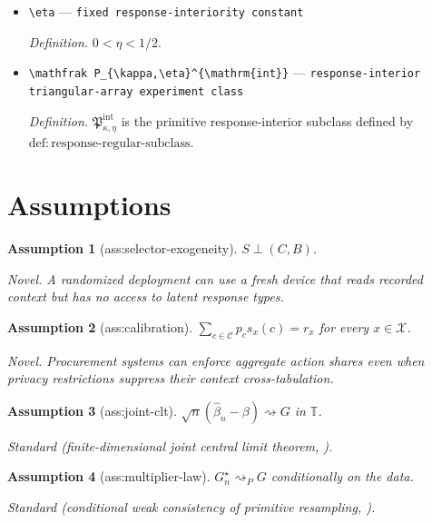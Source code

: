 \documentclass{article}
\newtheorem{assumption}{Assumption}
\begin{document}
\begin{itemize}
  \item \texttt{\textbackslash{}\allowbreak{}eta} --- \texttt{fixed response-\allowbreak{}interiority constant}
  \par\smallskip\noindent\emph{Definition.} \(0<\eta<1/2\).
  \item \texttt{\textbackslash{}\allowbreak{}mathfrak P\_\allowbreak{}\{\textbackslash{}\allowbreak{}kappa,\allowbreak{}\textbackslash{}\allowbreak{}eta\}\allowbreak{}\textasciicircum{}\{\textbackslash{}\allowbreak{}mathrm\{int\}\allowbreak{}\}\allowbreak{}} --- \texttt{response-\allowbreak{}interior triangular-\allowbreak{}array experiment class}
  \par\smallskip\noindent\emph{Definition.} \(\mathfrak P_{\kappa,\eta}^{\mathrm{int}}\) is the primitive response-interior subclass defined by \(\mathrm{def:response\text{-}regular\text{-}subclass}\).
\end{itemize}

\section{Assumptions}

\begin{assumption}[ass:selector-exogeneity]\label{ass:selector-exogeneity}
\(S\perp(C,B)\).
\par\smallskip\noindent\emph{Novel.} A randomized deployment can use a fresh device that reads recorded context but has no access to latent response types.
\end{assumption}

\begin{assumption}[ass:calibration]\label{ass:calibration}
\(\sum_{c\in\mathcal C}p_cs_x(c)=r_x\) for every \(x\in\mathcal X\).
\par\smallskip\noindent\emph{Novel.} Procurement systems can enforce aggregate action shares even when privacy restrictions suppress their context cross-tabulation.
\end{assumption}

\begin{assumption}[ass:joint-clt]\label{ass:joint-clt}
\(\sqrt n(\widehat\beta_n-\beta)\rightsquigarrow G\) in \(\mathbb T\).
\par\smallskip\noindent\emph{Standard} (finite-dimensional joint central limit theorem, \cite{FangSantos2019DirectionalInference}).
\end{assumption}

\begin{assumption}[ass:multiplier-law]\label{ass:multiplier-law}
\(G_n^\star\rightsquigarrow_P G\) conditionally on the data.
\par\smallskip\noindent\emph{Standard} (conditional weak consistency of primitive resampling, \cite{HongLi2018NumericalDelta}).
\end{assumption}
\end{document}
